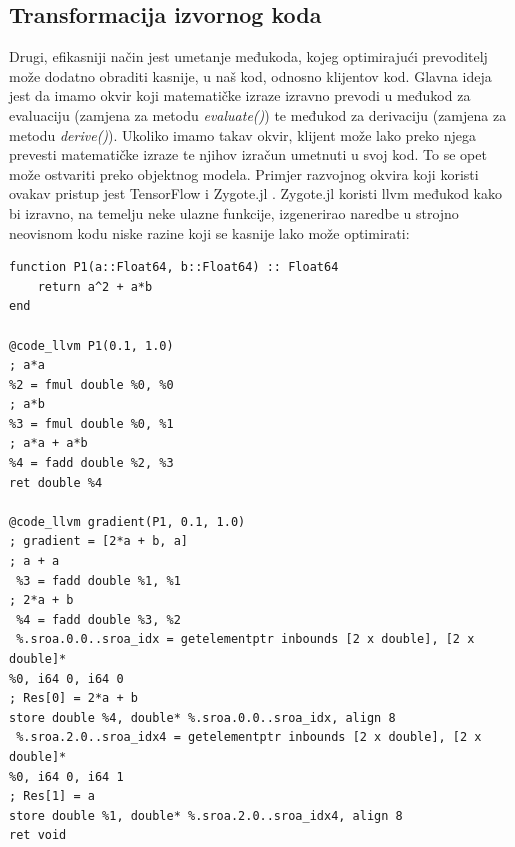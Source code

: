 \documentclass[zavrsnirad]{fer}
\begin{document}
\subsection{Transformacija izvornog koda}

Drugi, efikasniji način jest umetanje međukoda, kojeg optimirajući prevoditelj može dodatno obraditi kasnije, u naš kod, odnosno klijentov kod. Glavna ideja jest da imamo okvir koji matematičke izraze izravno prevodi u međukod za evaluaciju (zamjena za metodu \textit{evaluate()}) te međukod za derivaciju (zamjena za metodu \textit{derive()}). Ukoliko imamo takav okvir, klijent može lako preko njega prevesti matematičke izraze te njihov izračun umetnuti u svoj kod. To se opet može ostvariti preko objektnog modela. Primjer razvojnog okvira koji koristi ovakav pristup jest TensorFlow i Zygote.jl \cite{prague:diffcpp}. Zygote.jl koristi llvm međukod kako bi izravno, na temelju neke ulazne funkcije, izgenerirao naredbe u strojno neovisnom kodu niske razine koji se kasnije lako može optimirati:
\\

\begin{lstlisting}[caption={Primjer korištenja Zygote.jl za generiranje llvm međukoda za funkciju: $a^2 + a*b$ \cite{prague:diffcpp}}]
function P1(a::Float64, b::Float64) :: Float64 
    return a^2 + a*b 
end

@code_llvm P1(0.1, 1.0) 
; a*a 
%2 = fmul double %0, %0 
; a*b 
%3 = fmul double %0, %1 
; a*a + a*b 
%4 = fadd double %2, %3 
ret double %4 
 
@code_llvm gradient(P1, 0.1, 1.0) 
; gradient = [2*a + b, a] 
; a + a 
 %3 = fadd double %1, %1 
; 2*a + b 
 %4 = fadd double %3, %2 
 %.sroa.0.0..sroa_idx = getelementptr inbounds [2 x double], [2 x double]* 
%0, i64 0, i64 0 
; Res[0] = 2*a + b 
store double %4, double* %.sroa.0.0..sroa_idx, align 8 
 %.sroa.2.0..sroa_idx4 = getelementptr inbounds [2 x double], [2 x double]* 
%0, i64 0, i64 1 
; Res[1] = a  
store double %1, double* %.sroa.2.0..sroa_idx4, align 8 
ret void
\end{lstlisting}

\pagebreak
\end{document}
